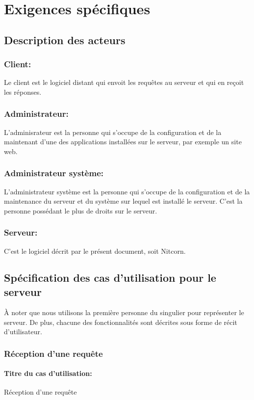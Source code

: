 \documentclass{scrreprt}
\begin{document}
\chapter{Exigences spécifiques}

\section{Description des acteurs}
\subsection{Client:} Le client est le logiciel distant qui envoit les requêtes au serveur et qui en reçoit les réponses. 
\subsection{Administrateur:} L'adminisrateur est la personne qui s'occupe de la configuration et de la maintenant d'une des applications installées sur le serveur, par exemple un site web.
\subsection{Administrateur système:} L'administrateur système est la personne qui s'occupe de la configuration et de la maintenance du serveur et du système sur lequel est installé le serveur. C'est la personne possédant le plus de droits sur le serveur.
\subsection{Serveur:} C'est le logiciel décrit par le présent document, soit Nitcorn.




\section{Spécification des cas d'utilisation pour le serveur} 
À noter que nous utilisons la première personne du singulier pour représenter le serveur. De plus, chacune des fonctionnalités sont décrites sous forme de récit d'utilisateur.
\subsection{Réception d'une requête}
\subsubsection{Titre du cas d'utilisation:} Réception d'une requête
\end{document}
